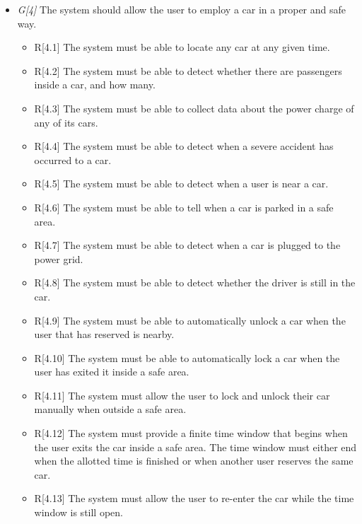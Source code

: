 \begin{itemize}
				\item \textit{G[4]} The system should allow the user to employ a car in a proper and safe way. 
					\begin{itemize}
						\item R[4.1] The system must be able to locate any car at any given time. 
						\item R[4.2] The system must be able to detect whether there are passengers inside a car, and how many.
						\item R[4.3] The system must be able to collect data about the power charge of any of its cars.
						\item R[4.4] The system must be able to detect when a severe accident has occurred to a car.
						\item R[4.5] The system must be able to detect when a user is near a car.
						\item R[4.6] The system must be able to tell when a car is parked in a safe area.
						\item R[4.7] The system must be able to detect when a car is plugged to the power grid.
						\item R[4.8] The system must be able to detect whether the driver is still in the car.
						\item R[4.9] The system must be able to automatically unlock a car when the user that has reserved is nearby. %
						\item R[4.10] The system must be able to automatically lock a car when the user has exited it inside a safe area. 
						\item R[4.11] The system must allow the user to lock and unlock their car manually when outside a safe area.
						\item R[4.12] The system must provide a finite time window that begins when the user exits the car inside a safe area. The time window must either end when the allotted time is finished or when another user reserves the same car.
						\item R[4.13] The system must allow the user to re-enter the car while the time window is still open. 
					\end{itemize}
					

\end{itemize}
